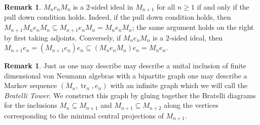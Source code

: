 \documentclass[11pt]{article}
\theoremstyle{plain}
\theoremstyle{definition}
\newtheorem{rem}[thm]{Remark}
\DeclareMathOperator{\tr}{tr}
\begin{document}
\begin{rem}\label{pulldowniff}
$M_n e_n M_n$ is a 2-sided ideal in $M_{n+1}$ for all $n\geq 1$ if and only if the pull down condition holds. Indeed, if the pull down condition holds, then $M_{n+1} M_n e_n M_n \subseteq M_{n+1} e_n M_n = M_n e_n M_n$; the same argument holds on the right by first taking adjoints. Conversely, if $M_n e_n M_n$ is a 2-sided ideal, then $M_{n+1} e_n = (M_{n+1} e_n)e_n \subseteq (M_n e_n M_n) e_n = M_n e_n$.
\end{rem}

\begin{rem}\label{Rem:BratelliTower}
Just as one may describe may describe a unital inclusion of finite dimensional von Neumann algebras with a bipartite graph one may describe a Markov sequence $\left( M_{n}, \tr_{n}, e_{n} \right )$ with an infinite graph which we will call the \textit{Bratelli Tower}. We construct this graph by gluing together the Bratelli diagrams for the inclusions $M_{n}\subseteq M_{n+1}$ and $M_{n+1}\subseteq M_{n+2}$ along the vertices corresponding to the minimal central projections of $M_{n+1}$.
\end{rem}
\end{document}
